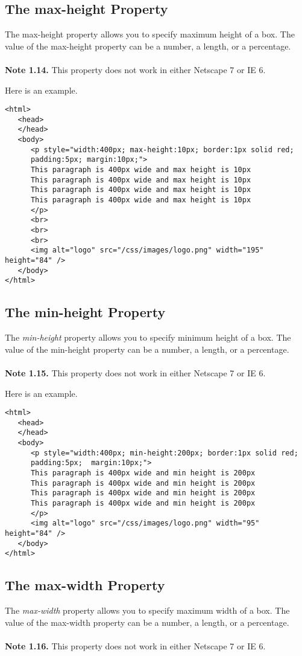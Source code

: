\documentclass[a4paper,oneside]{book}
\numberwithin{equation}{chapter}
\begin{document}
\subsection{The max-height Property}
The max-height property allows you to specify maximum height of a box. The value of the max-height property can be a number, a length, or a percentage.\\
\\
\textbf{Note 1.14.} This property does not work in either Netscape 7 or IE 6.

Here is an example.
\begin{verbatim}
<html>
   <head>
   </head>  
   <body>
      <p style="width:400px; max-height:10px; border:1px solid red; 
      padding:5px; margin:10px;">
      This paragraph is 400px wide and max height is 10px
      This paragraph is 400px wide and max height is 10px
      This paragraph is 400px wide and max height is 10px
      This paragraph is 400px wide and max height is 10px
      </p>
      <br>
      <br>
      <br>
      <img alt="logo" src="/css/images/logo.png" width="195" height="84" />
   </body>
</html> 
\end{verbatim}
\subsection{The min-height Property}
The \textit{min-height} property allows you to specify minimum height of a box. The value of the min-height property can be a number, a length, or a percentage.\\
\\
\textbf{Note 1.15.} This property does not work in either Netscape 7 or IE 6.

Here is an example.
\begin{verbatim}
<html>
   <head>
   </head>
   <body>
      <p style="width:400px; min-height:200px; border:1px solid red; 
      padding:5px;  margin:10px;">
      This paragraph is 400px wide and min height is 200px
      This paragraph is 400px wide and min height is 200px
      This paragraph is 400px wide and min height is 200px
      This paragraph is 400px wide and min height is 200px
      </p>
      <img alt="logo" src="/css/images/logo.png" width="95" height="84" />
   </body>
</html> 
\end{verbatim}
\subsection{The max-width Property}
The \textit{max-width} property allows you to specify maximum width of a box. The value of the max-width property can be a number, a length, or a percentage.\\
\\
\textbf{Note 1.16.} This property does not work in either Netscape 7 or IE 6.
\end{document}
